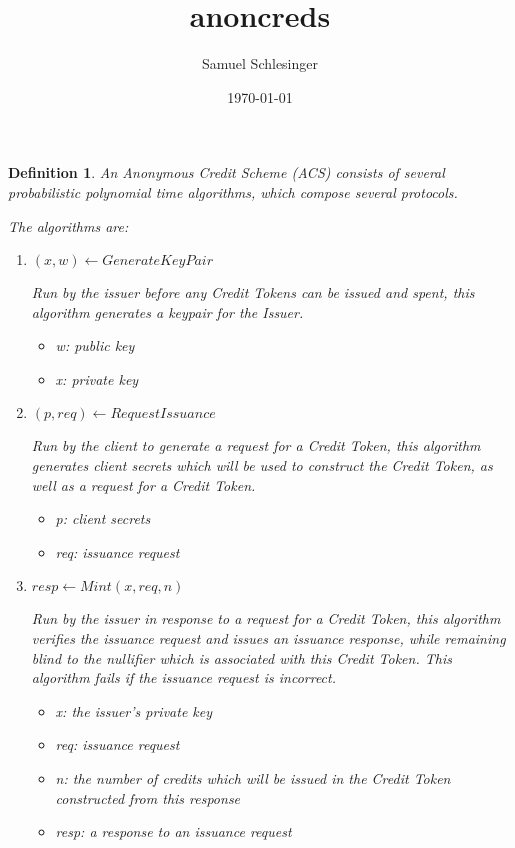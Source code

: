 \documentclass{article}
\title{anoncreds}
\author{Samuel Schlesinger}
\date{\today}
\newtheorem{definition}{Definition}
\begin{document}
\maketitle

\begin{definition}

An Anonymous Credit Scheme (ACS) consists of several probabilistic polynomial
time algorithms, which compose several protocols. 

The algorithms are:

\begin{enumerate}

    \item $(x, w) \leftarrow GenerateKeyPair$

        Run by the issuer before any Credit Tokens can be issued and spent,
        this algorithm generates a keypair for the Issuer.

    \begin{itemize}
        \item w: public key
        \item x: private key
    \end{itemize}

    \item $(p, req) \leftarrow RequestIssuance$

        Run by the client to generate a request for a Credit Token, this
        algorithm generates client secrets which will be used to construct the
        Credit Token, as well as a request for a Credit Token.

    \begin{itemize}
        \item p: client secrets
        \item req: issuance request
    \end{itemize}

    \item $resp \leftarrow Mint(x, req, n)$

        Run by the issuer in response to a request for a Credit Token, this
        algorithm verifies the issuance request and issues an issuance
        response, while remaining blind to the nullifier which is associated
        with this Credit Token. This algorithm fails if the issuance request is
        incorrect.

    \begin{itemize}
        \item x: the issuer's private key
        \item req: issuance request
        \item n: the number of credits which will be issued in the Credit Token
              constructed from this response
        \item resp: a response to an issuance request
    \end{itemize}


\end{enumerate}
\end{definition}
\end{document}
